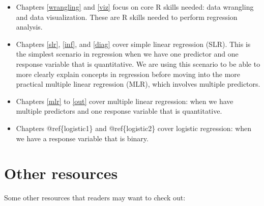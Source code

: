 \documentclass[
]{book}
\begin{document}
\begin{itemize}
\item
  Chapters \ref{wrangling} and \ref{viz} focus on core R skills needed: data wrangling and data visualization. These are R skills needed to perform regression analysis.
\item
  Chapters \ref{slr}, \ref{inf}, and \ref{diag} cover simple linear regression (SLR). This is the simplest scenario in regression when we have one predictor and one response variable that is quantitative. We are using this scenario to be able to more clearly explain concepts in regression before moving into the more practical multiple linear regression (MLR), which involves multiple predictors.
\item
  Chapters \ref{mlr} to \ref{out} cover multiple linear regression: when we have multiple predictors and one response variable that is quantitative.
\item
  Chapters @ref\{logistic1\} and @ref\{logistic2\} cover logistic regression: when we have a response variable that is binary.
\end{itemize}

\hypertarget{other-resources}{%
\section*{Other resources}\label{other-resources}}

Some other resources that readers may want to check out:
\end{document}
